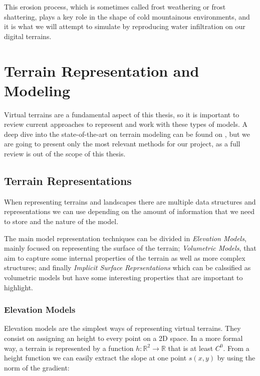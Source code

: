 \vspace{10pt}

This erosion process, which is sometimes called frost weathering or 
frost shattering, plays a key role in the shape of cold mountainous 
environments, and it is what we will attempt to simulate by reproducing
water infiltration on our digital terrains.

\section{Terrain Representation and Modeling}
Virtual terrains are a fundamental aspect of this thesis, so it is important 
to review current approaches to represent and work with these types of models.
A deep dive into the state-of-the-art on terrain modeling can be found on 
\cite{galin2019review}, but we are going to present only the most relevant 
methods for our project, as a full review is out of the scope of this thesis.

\subsection{Terrain Representations} \label{TerrainRep}

When representing terrains and landscapes there are multiple data structures 
and representations we can use depending on the amount of information that 
we need to store and the nature of the model.

\vspace{10pt}

The main model representation techniques can be divided in \textit{Elevation
Models}, mainly focused on representing the surface of the terrain; 
\textit{Volumetric Models}, that aim to capture some internal properties of 
the terrain as well as more complex structures; and finally \textit{Implicit 
Surface Reprsentations} which can be calssified as volumetric models but have 
some interesting properties that are important to highlight.

\subsubsection{Elevation Models}
Elevation models are the simplest ways of representing virtual terrains. 
They consist on assigning an height to every point on a 2D space. In a more 
formal way, a terrain is represented by a function $h: \mathbb{R}^2 
\to \mathbb{R}$ that is at least $C^0$. From a height function we 
can easily extract the slope at one point $s(x,y)$ by using the norm of 
the gradient:

